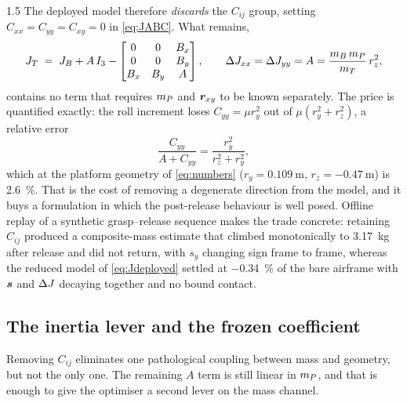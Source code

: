 \begin{spacing}{1.5}
The deployed model therefore \emph{discards} the $C_{ij}$ group, setting
$C_{xx}=C_{yy}=C_{xy}=0$ in \eqref{eq:JABC}. What remains,
\begin{equation}
J_T \;=\; J_B + A\,I_3 -
\begin{bmatrix} 0 & 0 & B_x \\ 0 & 0 & B_y \\ B_x & B_y & A\end{bmatrix},
\qquad
\Delta J_{xx}=\Delta J_{yy}=A=\frac{m_B\,m_P}{m_T}\,r_z^2 ,
\label{eq:Jdeployed}
\end{equation}
contains no term that requires $m_P$ and $\bm{r}_{xy}$ to be known separately.
The price is quantified exactly: the roll increment loses $C_{yy}=\mu r_y^2$ out
of $\mu(r_y^2+r_z^2)$, a relative error
\begin{equation}
\frac{C_{yy}}{A + C_{yy}} = \frac{r_y^2}{r_z^2+r_y^2},
\label{eq:Cerror}
\end{equation}
which at the platform geometry of \eqref{eq:numbers} ($r_y=\SI{0.109}{\meter}$,
$r_z=\SI{-0.47}{\meter}$) is \SI{2.6}{\percent}. That is the cost of removing a
degenerate direction from the model, and it buys a formulation in which the
post-release behaviour is well posed. Offline replay of a synthetic
grasp--release sequence makes the trade concrete: retaining $C_{ij}$ produced a
composite-mass estimate that climbed monotonically to \SI{3.17}{\kg} after
release and did not return, with $s_y$ changing sign frame to frame, whereas the
reduced model of \eqref{eq:Jdeployed} settled at \SI{-0.34}{\percent} of the bare
airframe with $\bm{s}$ and $\Delta J$ decaying together and no bound contact.

\subsection{The inertia lever and the frozen coefficient}\label{sec:model:Amode}

Removing $C_{ij}$ eliminates one pathological coupling between mass and geometry,
but not the only one. The remaining $A$ term is still linear in $m_P$, and that
is enough to give the optimiser a second lever on the mass channel.


\end{spacing}
